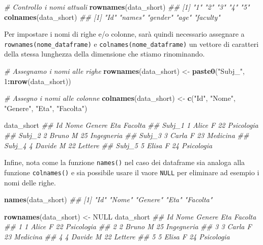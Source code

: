 \documentclass[
]{book}
\newenvironment{Shaded}{\begin{snugshade}}{\end{snugshade}}
\newcommand{\CommentTok}[1]{\textcolor[rgb]{0.56,0.35,0.01}{\textit{#1}}}
\newcommand{\DecValTok}[1]{\textcolor[rgb]{0.00,0.00,0.81}{#1}}
\newcommand{\KeywordTok}[1]{\textcolor[rgb]{0.13,0.29,0.53}{\textbf{#1}}}
\newcommand{\NormalTok}[1]{#1}
\newcommand{\OperatorTok}[1]{\textcolor[rgb]{0.81,0.36,0.00}{\textbf{#1}}}
\newcommand{\OtherTok}[1]{\textcolor[rgb]{0.56,0.35,0.01}{#1}}
\newcommand{\StringTok}[1]{\textcolor[rgb]{0.31,0.60,0.02}{#1}}
\begin{document}
\begin{Shaded}
\begin{Highlighting}[]
\CommentTok{# Controllo i nomi attuali}
\KeywordTok{rownames}\NormalTok{(data_short)}
\CommentTok{## [1] "1" "2" "3" "4" "5"}
\KeywordTok{colnames}\NormalTok{(data_short)}
\CommentTok{## [1] "Id"      "names"   "gender"  "age"     "faculty"}
\end{Highlighting}
\end{Shaded}

Per impostare i nomi di righe e/o colonne, sarà quindi necessario assegnare a \texttt{rownames(nome\_dataframe)} e \texttt{colnames(nome\_dataframe)} un vettore di caratteri della stessa lunghezza della dimensione che stiamo rinominando.

\begin{Shaded}
\begin{Highlighting}[]
\CommentTok{# Assegnamo i nomi alle righe}
\KeywordTok{rownames}\NormalTok{(data_short) <-}\StringTok{ }\KeywordTok{paste0}\NormalTok{(}\StringTok{"Subj_"}\NormalTok{, }\DecValTok{1}\OperatorTok{:}\KeywordTok{nrow}\NormalTok{(data_short))}

\CommentTok{# Assegno i nomi alle colonne}
\KeywordTok{colnames}\NormalTok{(data_short) <-}\StringTok{ }\KeywordTok{c}\NormalTok{(}\StringTok{"Id"}\NormalTok{, }\StringTok{"Nome"}\NormalTok{, }\StringTok{"Genere"}\NormalTok{, }\StringTok{"Eta"}\NormalTok{, }\StringTok{"Facolta"}\NormalTok{)}

\NormalTok{data_short}
\CommentTok{##        Id   Nome Genere Eta    Facolta}
\CommentTok{## Subj_1  1  Alice      F  22 Psicologia}
\CommentTok{## Subj_2  2  Bruno      M  25 Ingegneria}
\CommentTok{## Subj_3  3  Carla      F  23   Medicina}
\CommentTok{## Subj_4  4 Davide      M  22    Lettere}
\CommentTok{## Subj_5  5  Elisa      F  24 Psicologia}
\end{Highlighting}
\end{Shaded}

Infine, nota come la funzione \texttt{names()} nel caso dei dataframe sia analoga alla funzione \texttt{colnames()} e sia possibile usare il vaore \texttt{NULL} per eliminare ad esempio i nomi delle righe.

\begin{Shaded}
\begin{Highlighting}[]
\KeywordTok{names}\NormalTok{(data_short)}
\CommentTok{## [1] "Id"      "Nome"    "Genere"  "Eta"     "Facolta"}

\KeywordTok{rownames}\NormalTok{(data_short) <-}\StringTok{ }\OtherTok{NULL}
\NormalTok{data_short}
\CommentTok{##   Id   Nome Genere Eta    Facolta}
\CommentTok{## 1  1  Alice      F  22 Psicologia}
\CommentTok{## 2  2  Bruno      M  25 Ingegneria}
\CommentTok{## 3  3  Carla      F  23   Medicina}
\CommentTok{## 4  4 Davide      M  22    Lettere}
\CommentTok{## 5  5  Elisa      F  24 Psicologia}
\end{Highlighting}
\end{Shaded}
\end{document}
